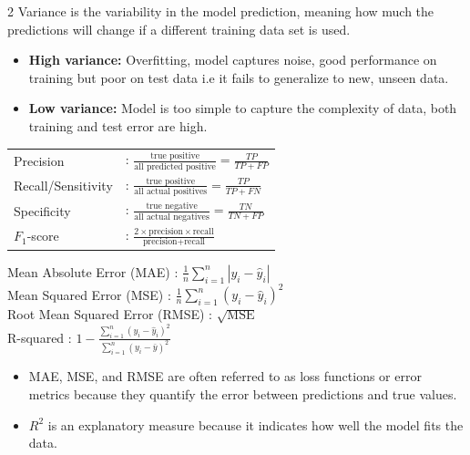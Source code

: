 \begin{multicols}{2}
Variance is the variability in the model prediction, meaning how much the predictions will change if a different training data set is used.
\begin{itemize}[topsep=-0.5em, parsep=0.5em]
   \item \textbf{High variance:} Overfitting, model captures noise, good performance on training but poor on test data i.e it fails to generalize to new,
   unseen data.
   \item \textbf{Low variance:} Model is too simple to capture the complexity of data, both training and test error are high.
\end{itemize}


\begin{tabular}{ll}
   Precision &: 
   $\frac{\text{true positive}}
   {\text{all predicted positive}}=\frac{TP}{TP+FP}$ \\[1.5em]

   Recall/Sensitivity &: 
   $\frac{\text{true positive}}
   {\text{all actual positives}}=\frac{TP}{TP+FN}$ \\[1.5em]

   Specificity &: 
   $\frac{\text{true negative}}
   {\text{all actual negatives}}=\frac{TN}{TN+FP}$ \\[1.5em]
   
   $F_1$-score &: 
   $\frac{\text{2} \times \text{precision} \times \text{recall}}
   {\text{precision} + \text{recall}}$ \\[1.5em]
\end{tabular}

Mean Absolute Error (MAE) :
$\frac{1}{n} \sum_{i=1}^{n} |y_i - \hat{y}_i|$ \\[0.5em]
Mean Squared Error (MSE) :
$\frac{1}{n} \sum_{i=1}^{n} (y_i - \hat{y}_i)^2$ \\[0.5em]
Root Mean Squared Error (RMSE) :
$\sqrt{\text{MSE}}$ \\[0.5em]
R-squared :
$1 - \frac{\sum_{i=1}^{n} (y_i - \hat{y}_i)^2}
{\sum_{i=1}^{n} (y_i - \bar{y})^2}$ \\

\begin{itemize}[leftmargin=*, itemsep=0pt, parsep=0.25em, topsep=-1em]
   \item MAE, MSE, and RMSE are often referred to as loss functions or error metrics because they quantify the error between predictions and true values.
   \item $R^2$ is an explanatory measure because it indicates how well the model fits the data.
\end{itemize}



\end{multicols}
